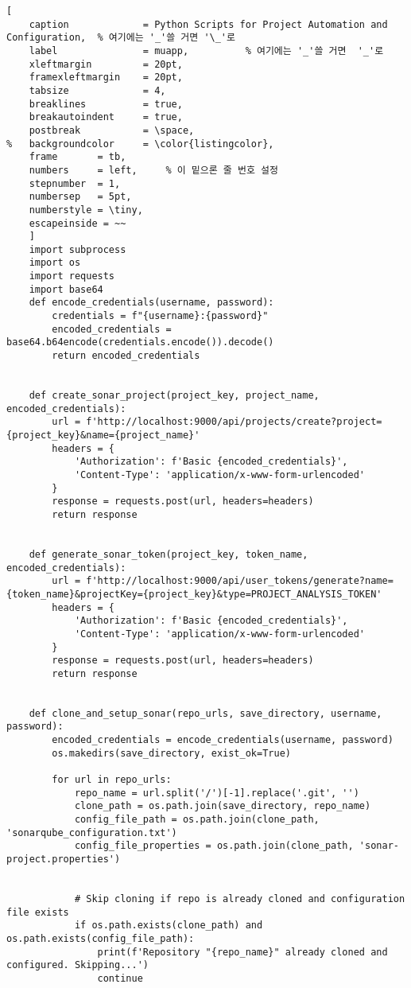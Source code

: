 \begin{lstlisting}[
	caption				= Python Scripts for Project Automation and Configuration,	% 여기에는 '_'쓸 거면 '\_'로
	label				= muapp,          % 여기에는 '_'쓸 거면  '_'로
	xleftmargin			= 20pt,
	framexleftmargin	= 20pt,
	tabsize				= 4,
	breaklines			= true,
	breakautoindent		= true,
	postbreak			= \space,
%	backgroundcolor		= \color{listingcolor}, 
	frame		= tb,
	numbers		= left,		% 이 밑으론 줄 번호 설정
	stepnumber	= 1,
	numbersep	= 5pt,
	numberstyle	= \tiny,
	escapeinside = ~~
	]	
    import subprocess
    import os
    import requests
    import base64
    def encode_credentials(username, password):
        credentials = f"{username}:{password}"
        encoded_credentials = base64.b64encode(credentials.encode()).decode()
        return encoded_credentials
    
    
    def create_sonar_project(project_key, project_name, encoded_credentials):
        url = f'http://localhost:9000/api/projects/create?project={project_key}&name={project_name}'
        headers = {
            'Authorization': f'Basic {encoded_credentials}',
            'Content-Type': 'application/x-www-form-urlencoded'
        }
        response = requests.post(url, headers=headers)
        return response
    
    
    def generate_sonar_token(project_key, token_name, encoded_credentials):
        url = f'http://localhost:9000/api/user_tokens/generate?name={token_name}&projectKey={project_key}&type=PROJECT_ANALYSIS_TOKEN'
        headers = {
            'Authorization': f'Basic {encoded_credentials}',
            'Content-Type': 'application/x-www-form-urlencoded'
        }
        response = requests.post(url, headers=headers)
        return response
    
    
    def clone_and_setup_sonar(repo_urls, save_directory, username, password):
        encoded_credentials = encode_credentials(username, password)
        os.makedirs(save_directory, exist_ok=True)
    
        for url in repo_urls:
            repo_name = url.split('/')[-1].replace('.git', '')
            clone_path = os.path.join(save_directory, repo_name)
            config_file_path = os.path.join(clone_path, 'sonarqube_configuration.txt')
            config_file_properties = os.path.join(clone_path, 'sonar-project.properties')
    
    
            # Skip cloning if repo is already cloned and configuration file exists
            if os.path.exists(clone_path) and os.path.exists(config_file_path):
                print(f'Repository "{repo_name}" already cloned and configured. Skipping...')
                continue
    

\end{lstlisting}
